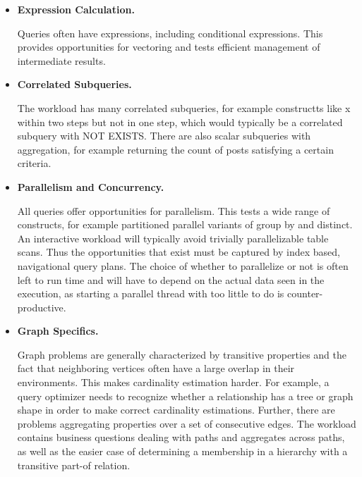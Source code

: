 \begin{itemize}
    \item \textbf{Expression Calculation.}

        Queries often have expressions, including conditional expressions.
        This provides opportunities for vectoring and tests efficient
        management of intermediate results.

    \item \textbf{Correlated Subqueries.}

        The workload has many correlated subqueries, for example constructts
        like x within two steps but not in one step, which would typically be
        a correlated subquery with NOT EXISTS.  There are also scalar
        subqueries with aggregation, for example returning the count of posts
        satisfying a certain criteria.


    \item \textbf{Parallelism and Concurrency.}

        All queries offer opportunities for parallelism.  This tests a wide
        range of constructs, for example partitioned parallel variants of
        group by and distinct.  An interactive workload will typically avoid
        trivially parallelizable table scans.  Thus the opportunities that
        exist must be captured by index based, navigational query plans.  The
        choice of whether to parallelize or not is often left to run time and
        will have to depend on the actual data seen in the execution, as
        starting a parallel thread with too little to do is
        counter-productive.


    \item \textbf{Graph Specifics.}

        Graph problems are generally characterized by transitive properties
        and the fact that neighboring vertices often have a large overlap in
        their environments.  This makes cardinality estimation harder.  For
        example, a query optimizer needs to recognize whether a relationship
        has a tree or graph shape in order to make correct cardinality
        estimations.  Further, there are problems aggregating properties over
        a set of consecutive edges.  The workload contains business questions
        dealing with paths and aggregates across paths, as well as the easier
        case of determining a membership in a hierarchy with a transitive
        part-of relation.
\end{itemize}
